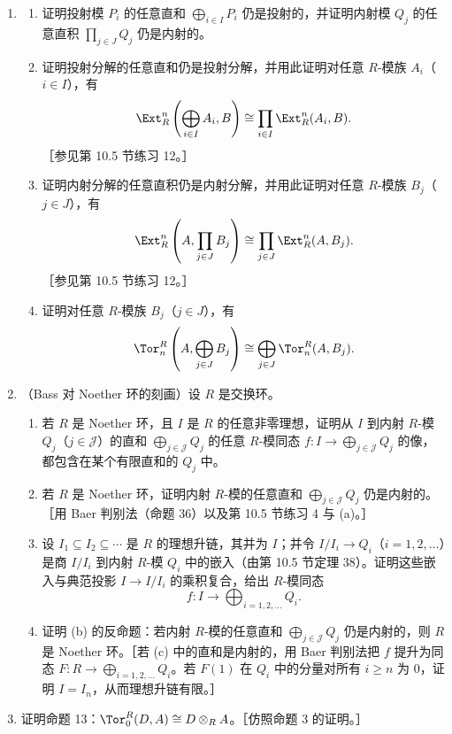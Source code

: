 \begin{enumerate}[label=\arabic*.]
  \item \begin{enumerate}[label=(\alph*)]
    \item 证明投射模 $P_i$ 的任意直和 $\bigoplus_{i\in I}P_i$ 仍是投射的，并证明内射模 $Q_j$ 的任意直积 $\prod_{j\in J}Q_j$ 仍是内射的。
    \item 证明投射分解的任意直和仍是投射分解，并用此证明对任意 $R$-模族 $A_i$（$i\in I$），有
    \[
      \Ext_R^n\left(\bigoplus_{i\in I}A_i,B\right)\cong\prod_{i\in I}\Ext_R^n(A_i,B).
    \]
    ［参见第 10.5 节练习 12。］
    \item 证明内射分解的任意直积仍是内射分解，并用此证明对任意 $R$-模族 $B_j$（$j\in J$），有
    \[
      \Ext_R^n\left(A,\prod_{j\in J}B_j\right)\cong\prod_{j\in J}\Ext_R^n(A,B_j).
    \]
    ［参见第 10.5 节练习 12。］
    \item 证明对任意 $R$-模族 $B_j$（$j\in J$），有
    \[
      \Tor_n^R\left(A,\bigoplus_{j\in J}B_j\right)\cong\bigoplus_{j\in J}\Tor_n^R(A,B_j).
    \]
  \end{enumerate}

  \item （Bass 对 Noether 环的刻画）设 $R$ 是交换环。
  \begin{enumerate}[label=(\alph*)]
    \item 若 $R$ 是 Noether 环，且 $I$ 是 $R$ 的任意非零理想，证明从 $I$ 到内射 $R$-模 $Q_j$（$j\in\mathcal J$）的直和 $\bigoplus_{j\in\mathcal J}Q_j$ 的任意 $R$-模同态 $f:I\to\bigoplus_{j\in\mathcal J}Q_j$ 的像，都包含在某个有限直和的 $Q_j$ 中。
    \item 若 $R$ 是 Noether 环，证明内射 $R$-模的任意直和 $\bigoplus_{j\in\mathcal J}Q_j$ 仍是内射的。［用 Baer 判别法（命题 36）以及第 10.5 节练习 4 与 (a)。］
    \item 设 $I_1\subseteq I_2\subseteq\cdots$ 是 $R$ 的理想升链，其并为 $I$；并令 $I/I_i\to Q_i$（$i=1,2,\ldots$）是商 $I/I_i$ 到内射 $R$-模 $Q_i$ 中的嵌入（由第 10.5 节定理 38）。证明这些嵌入与典范投影 $I\to I/I_i$ 的乘积复合，给出 $R$-模同态
    \[
      f:I\to\bigoplus_{i=1,2,\ldots}Q_i.
    \]
    \item 证明 (b) 的反命题：若内射 $R$-模的任意直和 $\bigoplus_{j\in\mathcal J}Q_j$ 仍是内射的，则 $R$ 是 Noether 环。［若 (c) 中的直和是内射的，用 Baer 判别法把 $f$ 提升为同态 $F:R\to\bigoplus_{i=1,2,\ldots}Q_i$。若 $F(1)$ 在 $Q_i$ 中的分量对所有 $i\geq n$ 为 $0$，证明 $I=I_n$，从而理想升链有限。］
  \end{enumerate}

  \item 证明命题 13：$\Tor_0^R(D,A)\cong D\otimes_R A$。［仿照命题 3 的证明。］


\end{enumerate}

